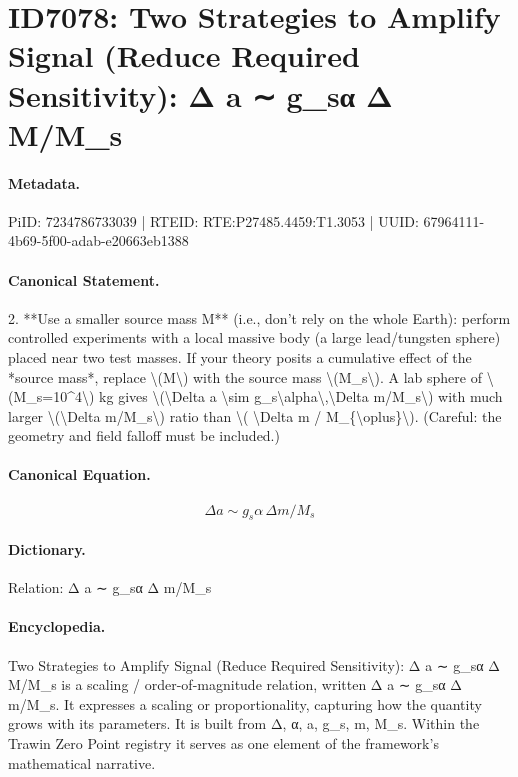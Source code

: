 \section*{ID7078: Two Strategies to Amplify Signal (Reduce Required Sensitivity): Δ a ∼ g\_sα Δ M/M\_s}
\paragraph{Metadata.}
PiID: 7234786733039 | RTEID: RTE:P27485.4459:T1.3053 | UUID: 67964111-4b69-5f00-adab-e20663eb1388

\paragraph{Canonical Statement.}
2. **Use a smaller source mass M** (i.e., don’t rely on the whole Earth): perform controlled experiments with a local massive body (a large lead/tungsten sphere) placed near two test masses. If your theory posits a cumulative effect of the *source mass*, replace \textbackslash{}(M\textbackslash{}) with the source mass \textbackslash{}(M\_s\textbackslash{}). A lab sphere of \textbackslash{}(M\_s=10\textasciicircum{}4\textbackslash{}) kg gives \textbackslash{}(\textbackslash{}Delta a \textbackslash{}sim g\_s\textbackslash{}alpha\textbackslash{},\textbackslash{}Delta m/M\_s\textbackslash{}) with much larger \textbackslash{}(\textbackslash{}Delta m/M\_s\textbackslash{}) ratio than \textbackslash{}( \textbackslash{}Delta m / M\_\{\textbackslash{}oplus\}\textbackslash{}). (Careful: the geometry and field falloff must be included.)

\paragraph{Canonical Equation.}
\[
\Delta a \sim g_s\alpha\,\Delta m/M_s
\]

\paragraph{Dictionary.}
Relation: Δ a ∼ g\_sα Δ m/M\_s

\paragraph{Encyclopedia.}
Two Strategies to Amplify Signal (Reduce Required Sensitivity): Δ a ∼ g\_sα Δ M/M\_s is a scaling / order-of-magnitude relation, written Δ a ∼ g\_sα Δ m/M\_s. It expresses a scaling or proportionality, capturing how the quantity grows with its parameters. It is built from Δ, α, a, g\_s, m, M\_s. Within the Trawin Zero Point registry it serves as one element of the framework's mathematical narrative.
